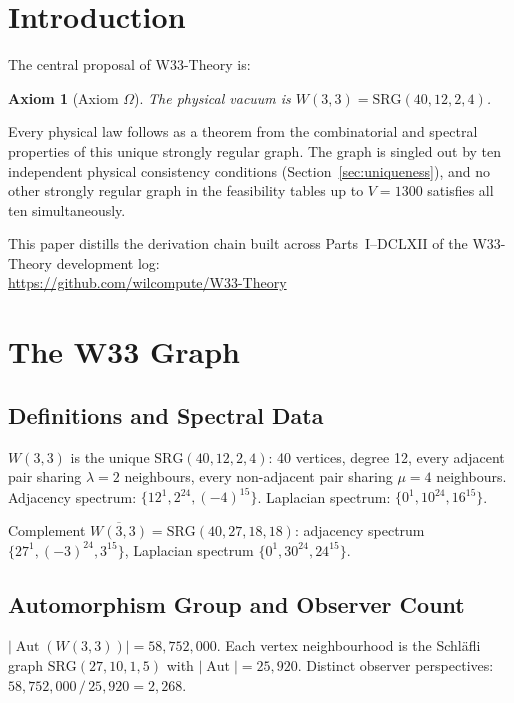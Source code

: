 \documentclass[12pt,a4paper]{article}
\newtheorem{axiom}[theorem]{Axiom}
\newcommand{\W}{W(3,3)}
\newcommand{\Wbar}{\overline{W(3,3)}}
\DeclareMathOperator{\Aut}{Aut}
\begin{document}
\newpage

\section{Introduction}
\label{sec:intro}

The central proposal of W33-Theory is:

\begin{axiom}[Axiom $\Omega$]
The physical vacuum is $\W = \mathrm{SRG}(40,12,2,4)$.
\end{axiom}

Every physical law follows as a theorem from the combinatorial and spectral
properties of this unique strongly regular graph. The graph is singled out by
ten independent physical consistency conditions
(Section~\ref{sec:uniqueness}), and no other strongly regular graph
in the feasibility tables up to $V=1300$ satisfies all ten simultaneously.

This paper distills the derivation chain built across Parts~I--DCLXII of
the W33-Theory development log:\\[2pt]
\url{https://github.com/wilcompute/W33-Theory}

\section{The W33 Graph}
\label{sec:w33graph}

\subsection{Definitions and Spectral Data}

$\W$ is the unique $\mathrm{SRG}(40,12,2,4)$:
40 vertices, degree 12, every adjacent pair sharing $\lambda=2$ neighbours,
every non-adjacent pair sharing $\mu=4$ neighbours.
Adjacency spectrum: $\{12^1, 2^{24}, (-4)^{15}\}$.
Laplacian spectrum: $\{0^1, 10^{24}, 16^{15}\}$.

Complement $\Wbar = \mathrm{SRG}(40,27,18,18)$:
adjacency spectrum $\{27^1, (-3)^{24}, 3^{15}\}$,
Laplacian spectrum $\{0^1, 30^{24}, 24^{15}\}$.

\subsection{Automorphism Group and Observer Count}

$|\Aut(\W)| = 58{,}752{,}000$.
Each vertex neighbourhood is the Schl\"afli graph
$\mathrm{SRG}(27,10,1,5)$ with $|\Aut|=25{,}920$.
Distinct observer perspectives:
$58{,}752{,}000\,/\,25{,}920 = 2{,}268$.
\end{document}
